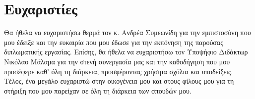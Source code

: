 \section*{Ευχαριστίες}
{}

Θα ήθελα να ευχαριστήσω θερμά τον κ. Ανδρέα Συμεωνίδη για την εμπιστοσύνη που μου έδειξε και την ευκαιρία που μου έδωσε για την εκπόνηση της παρούσας διπλωματικής εργασίας. Επίσης, θα ήθελα να ευχαριστήσω τον Υποψήφιο Διδάκτωρ Νικόλαο Μάλαμα για την στενή συνεργασία μας και την καθοδήγηση που μου προσέφερε καθ' όλη τη διάρκεια, προσφέροντας χρήσιμα σχόλια και υποδείξεις. Τέλος, ένα μεγάλο ευχαριστώ στην οικογένεια μου και στους φίλους μου για τη στήριξη που μου παρείχαν σε όλη τη διάρκεια των σπουδών μου.